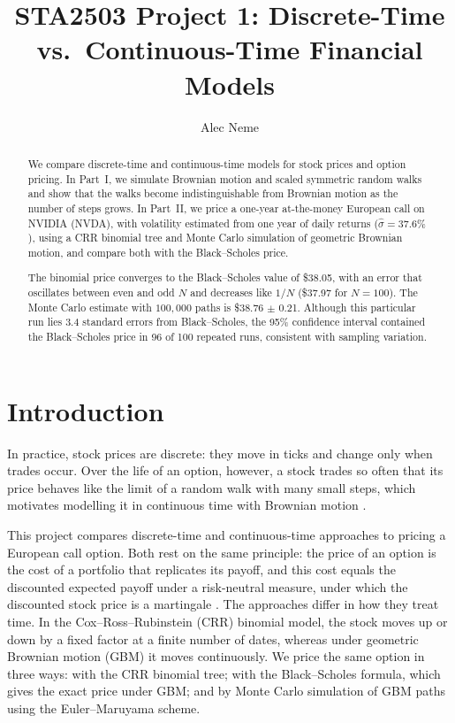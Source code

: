 \documentclass[12pt]{amsart}
\title[Discrete- vs.\ Continuous-Time Models]{STA2503 Project 1: Discrete-Time vs.\ Continuous-Time Financial Models}
\author{Alec Neme}
\begin{document}
\begin{abstract}
We compare discrete-time and continuous-time models for stock prices and option pricing. In
Part~I, we simulate Brownian motion and scaled symmetric random walks and show that the walks
become indistinguishable from Brownian motion as the number of steps grows. In Part~II, we price a
one-year at-the-money European call on NVIDIA (NVDA), with volatility estimated from one year of
daily returns ($\hat\sigma = 37.6\%$), using a CRR binomial tree and Monte Carlo simulation of
geometric Brownian motion, and compare both with the Black--Scholes price.

The binomial price converges to the Black--Scholes value of \$38.05, with an error that
oscillates between even and odd $N$ and decreases like $1/N$ (\$37.97 for $N = 100$). The Monte
Carlo estimate with $100{,}000$ paths is \$38.76 $\pm$ 0.21. Although this particular run
lies 3.4 standard errors from Black--Scholes, the 95\% confidence interval contained the
Black--Scholes price in 96 of 100 repeated runs, consistent with sampling variation.
\end{abstract}

\maketitle

\section{Introduction}
In practice, stock prices are discrete: they move in ticks and change only when trades occur.
Over the life of an option, however, a stock trades so often that its price behaves like the
limit of a random walk with many small steps, which motivates modelling it in continuous time
with Brownian motion \citep{shreve2004b}.

This project compares discrete-time and continuous-time approaches to pricing a European call
option. Both rest on the same principle: the price of an option is the cost of a portfolio that
replicates its payoff, and this cost equals the discounted expected payoff under a risk-neutral
measure, under which the discounted stock price is a martingale \citep{shreve2004a,shreve2004b}.
The approaches differ in how they treat time. In the Cox--Ross--Rubinstein (CRR) binomial model, the stock
moves up or down by a fixed factor at a finite number of dates, whereas under geometric Brownian
motion (GBM) it moves continuously. We price the same option in three ways: with the CRR binomial
tree; with the Black--Scholes formula, which gives the exact price under GBM;
and by Monte Carlo simulation of GBM paths using the Euler--Maruyama scheme.
\end{document}

